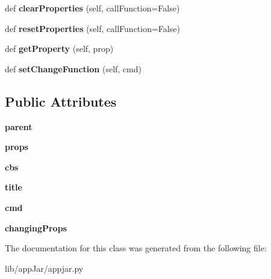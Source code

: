 \begin{DoxyCompactItemize}
\item 
\mbox{\label{classappjar_1_1_properties_a1ffa89fe1b8d3753748cf454afee7587}} 
def {\bfseries clear\+Properties} (self, call\+Function=False)
\item 
\mbox{\label{classappjar_1_1_properties_aaafae2331955bf67872295f3553350bc}} 
def {\bfseries reset\+Properties} (self, call\+Function=False)
\item 
\mbox{\label{classappjar_1_1_properties_a4c11f0ae3ff2cf8047520522c5c23fdd}} 
def {\bfseries get\+Property} (self, prop)
\item 
\mbox{\label{classappjar_1_1_properties_ae137043e01aa102597744ee8ec3c571d}} 
def {\bfseries set\+Change\+Function} (self, cmd)
\end{DoxyCompactItemize}
\subsection*{Public Attributes}
\begin{DoxyCompactItemize}
\item 
\mbox{\label{classappjar_1_1_properties_ab787bda0ef9645bfa867205244f50d28}} 
{\bfseries parent}
\item 
\mbox{\label{classappjar_1_1_properties_ac931267d66f52cdfa9efa10e48c89232}} 
{\bfseries props}
\item 
\mbox{\label{classappjar_1_1_properties_a73fd777e015ac6513908adc6210b1040}} 
{\bfseries cbs}
\item 
\mbox{\label{classappjar_1_1_properties_aa8cd614f01bd2036891042dc23a27d84}} 
{\bfseries title}
\item 
\mbox{\label{classappjar_1_1_properties_aef4e3d06269d0cc33b85243c4512a8fc}} 
{\bfseries cmd}
\item 
\mbox{\label{classappjar_1_1_properties_ac3a8d9ccb7547595ecbb981d1a716bef}} 
{\bfseries changing\+Props}
\end{DoxyCompactItemize}


The documentation for this class was generated from the following file\+:\begin{DoxyCompactItemize}
\item 
lib/app\+Jar/appjar.\+py\end{DoxyCompactItemize}
